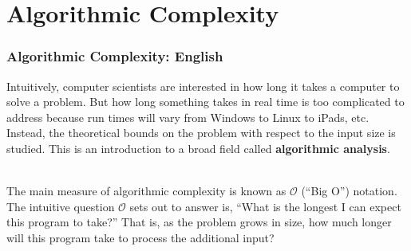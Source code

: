\documentclass[aspectratio=169]{beamer}
\begin{document}
\section{Algorithmic Complexity}
\begin{frame}
\frametitle{Algorithmic Complexity: English}
Intuitively, computer scientists are interested in how long it takes a computer to solve a problem. But how long something takes in real time is too complicated to address because run times will vary from Windows to Linux to iPads, etc. Instead, the theoretical bounds on the problem with respect to the input size is studied. This is an introduction to a broad field called \textbf{algorithmic analysis}.

\mbox{}\\
\pause
The main measure of algorithmic complexity is known as $\mathcal{O}$ (``Big O'') notation. The intuitive question $\mathcal{O}$ sets out to answer is, ``What is the longest I can expect this program to take?'' That is, as the problem grows in size, how much longer will this program take to process the additional input?
\end{frame}
\end{document}
